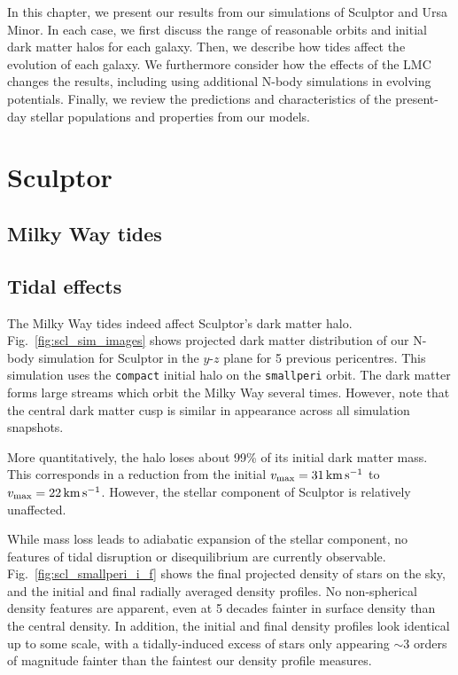 In this chapter, we present our results from our simulations of Sculptor
and Ursa Minor. In each case, we first discuss the range of reasonable
orbits and initial dark matter halos for each galaxy. Then, we describe
how tides affect the evolution of each galaxy. We furthermore consider
how the effects of the LMC changes the results, including using
additional N-body simulations in evolving potentials. Finally, we review
the predictions and characteristics of the present-day stellar
populations and properties from our models.

\section{Sculptor}\label{sculptor}

\subsection{Milky Way tides}\label{milky-way-tides}

\subsection{Tidal effects}\label{tidal-effects}

The Milky Way tides indeed affect Sculptor's dark matter halo.
Fig.~\ref{fig:scl_sim_images} shows projected dark matter distribution
of our N-body simulation for Sculptor in the \(y\)-\(z\) plane for 5
previous pericentres. This simulation uses the \texttt{compact} initial
halo on the \texttt{smallperi} orbit. The dark matter forms large
streams which orbit the Milky Way several times. However, note that the
central dark matter cusp is similar in appearance across all simulation
snapshots.

More quantitatively, the halo loses about 99\% of its initial dark
matter mass. This corresponds in a reduction from the initial
\(v_{\rm max} = 31\,{\rm km\,s^{-1}}\) to \(v_{\rm max} = 22\,{\rm km\,s^{-1}}\). However, the
stellar component of Sculptor is relatively unaffected.

While mass loss leads to adiabatic expansion of the stellar component,
no features of tidal disruption or disequilibrium are currently
observable. Fig.~\ref{fig:scl_smallperi_i_f} shows the final projected
density of stars on the sky, and the initial and final radially averaged
density profiles. No non-spherical density features are apparent, even
at 5 decades fainter in surface density than the central density. In
addition, the initial and final density profiles look identical up to
some scale, with a tidally-induced excess of stars only appearing
\(\sim 3\) orders of magnitude fainter than the faintest our density
profile measures.

